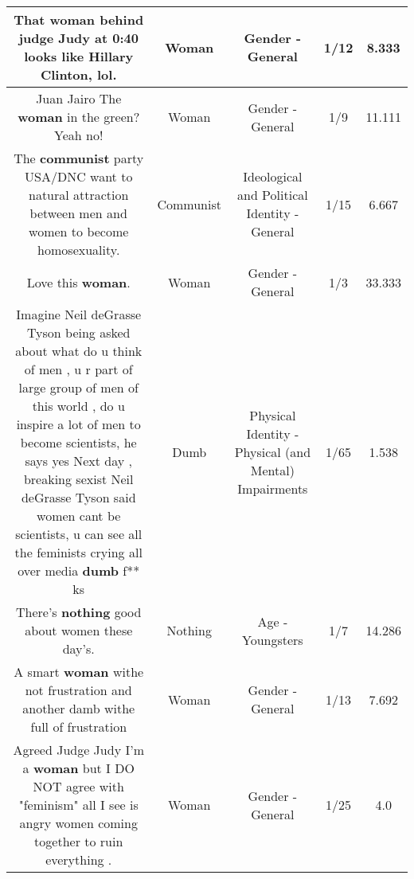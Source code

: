 \documentclass[11pt]{article}
\newlength\mylength
\begin{document}
\begin{center}
\begin{longtable}{|C{.65\mylength}|C{.30\mylength}|C{.12\mylength}|C{.12\mylength}|C{.12\mylength}|}
  \small That \textbf{woman} behind judge Judy at 0:40 looks like Hillary Clinton, lol.\normalsize   & Woman & Gender - General & 1/12 & 8.333 \\  \hline
  \small Juan Jairo The \textbf{woman} in the green? Yeah no!\normalsize   & Woman & Gender - General & 1/9 & 11.111 \\  \hline
  \small The \textbf{communist} party USA/DNC want to natural attraction between men and women to become homosexuality.\normalsize   & Communist &  Ideological and Political Identity - General & 1/15 & 6.667 \\  \hline
  \small Love this \textbf{woman}.\normalsize   & Woman & Gender - General & 1/3 & 33.333 \\  \hline
  \small Imagine Neil deGrasse Tyson  being asked about  what do u think of men , u r part of large group of men of this world , do u inspire a lot of men to become scientists, he says yes Next day , breaking  sexist Neil deGrasse Tyson said women cant  be scientists, u can see all the feminists crying all over media \textbf{dumb} f** ks\normalsize   & Dumb & Physical Identity - Physical (and Mental) Impairments & 1/65 & 1.538 \\  \hline
  \small There's \textbf{nothing} good about women these day's.\normalsize   & Nothing & Age - Youngsters & 1/7 & 14.286 \\  \hline
  \small A smart \textbf{woman} withe not frustration and another damb withe full of frustration\normalsize   & Woman & Gender - General & 1/13 & 7.692 \\  \hline
  \small Agreed Judge Judy I'm a \textbf{woman} but I DO NOT agree with "feminism" all I see is angry women coming together to ruin everything .\normalsize   & Woman & Gender - General & 1/25 & 4.0 \\  \hline

\end{longtable}
\end{center}
\end{document}

